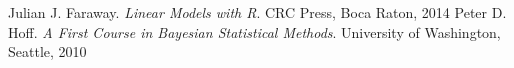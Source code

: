 \documentclass[a4page]{article}
\begin{document}
	\begin{thebibliography}{9}
		Julian J. Faraway.
		\textit{Linear Models with R}.
		CRC Press, Boca Raton, 2014
        Peter D. Hoff.
        \textit{A First Course in Bayesian Statistical Methods}.
        University of Washington, Seattle, 2010
	\end{thebibliography}
\end{document}
